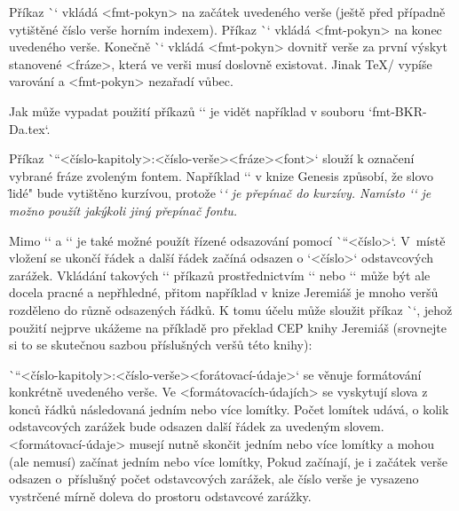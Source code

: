 Příkaz \`\fmtpre` vkládá <fmt-pokyn>
na začátek uvedeného verše (ještě před případně vytištěné číslo verše horním
indexem). Příkaz \`\fmtadd` vkládá <fmt-pokyn> na konec uvedeného verše.
Konečně \`\fmtins` vkládá <fmt-pokyn> dovnitř verše za první výskyt stanovené
<fráze>, která ve verši musí doslovně existovat. Jinak \TeX/ vypíše varování
a <fmt-pokyn> nezařadí vůbec.

Jak může vypadat použití příkazů `\fmt*` je vidět například v souboru
`fmt-BKR-Da.tex`.

Příkaz \`\fmtfont``{<číslo-kapitoly>:<číslo-verše>}{<fráze>}{<font>}`
slouží k označení vybrané fráze zvoleným fontem.
Například `` v knize Genesis způsobí, že slovo
\"lidé" bude vytištěno kurzívou, protože `\em` je přepínač do kurzívy.
Namísto `\em` je možno použít jakýkoli jiný přepínač fontu.

Mimo `\begcenter` a `\endcenter` je také možné použít řízené odsazování pomocí
\`\ind``<číslo>`. V~místě vložení se ukončí řádek a další řádek začíná
odsazen o `<číslo>` odstavcových zarážek. Vkládání takových `\ind` příkazů
prostřednictvím `\fmtins` nebo `\fmtpre` může být ale docela pracné a
nepřhledné, přitom například v knize Jeremiáš je mnoho veršů rozděleno do
různě odsazených řádků. K tomu účelu může sloužit příkaz \`\fmtpoetry`, jehož
použití nejprve ukážeme na příkladě pro překlad CEP knihy Jeremiáš
(srovnejte si to se skutečnou sazbou příslušných veršů této knihy):

\begtt
{}
\endtt

\`\fmtpoetry``{<číslo-kapitoly>:<číslo-verše>}{<forátovací-údaje>}` se
věnuje formátování konkrétně uvedeného verše. Ve <formátovacích-údajích> se
vyskytují slova z konců řádků následovaná jedním nebo více lomítky. Počet
lomítek udává, o kolik odstavcových zarážek bude odsazen další řádek za
uvedeným slovem. <formátovací-údaje> musejí nutně skončit jedním nebo více
lomítky a mohou (ale nemusí) začínat jedním nebo více lomítky, Pokud
začínají, je i začátek verše odsazen o~příslušný počet odstavcových zarážek,
ale číslo verše je vysazeno vystrčené mírně doleva do prostoru odstavcové
zarážky.

